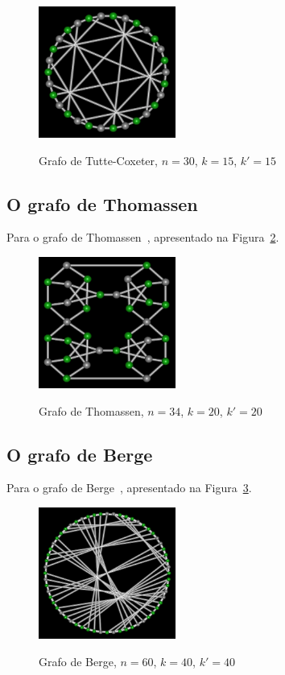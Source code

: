 \begin{figure}[htb]
\centering
\includegraphics[width=0.4\textwidth]{img/tutte.png}
\label{fig:example-tutte}
\caption{Grafo de Tutte-Coxeter, $n=30$, $k=15$, $k'=15$}
\end{figure}


\subsection{O grafo de Thomassen}
Para o grafo de Thomassen~\cite{cite:example-thomassen},
apresentado na Figura~\ref{fig:example-thomassen}.

\begin{figure}[htb]
\centering
\includegraphics[width=0.4\textwidth]{img/thomassen.png}
\label{fig:example-thomassen}
\caption{Grafo de Thomassen, $n=34$, $k=20$, $k'=20$}
\end{figure}


\subsection{O grafo de Berge}
Para o grafo de Berge~\cite{cite:example-berge},
apresentado na Figura~\ref{fig:example-berge}.

\begin{figure}[htb]
\centering
\includegraphics[width=0.4\textwidth]{img/berge.png}
\label{fig:example-berge}
\caption{Grafo de Berge, $n=60$, $k=40$, $k'=40$}
\end{figure}


